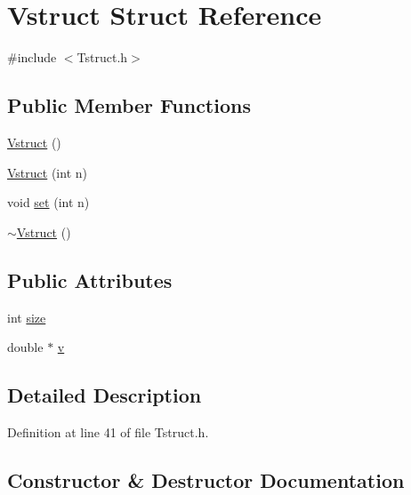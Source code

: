 \hypertarget{structVstruct}{}\section{Vstruct Struct Reference}
\label{structVstruct}


{\ttfamily \#include $<$Tstruct.\+h$>$}

\subsection*{Public Member Functions}
\begin{DoxyCompactItemize}
\item 
\hyperlink{structVstruct_a7152758ff9d7e6b9ff05a8e39a45d2e0}{Vstruct} ()
\item 
\hyperlink{structVstruct_a579bc58cb4f2ce68cf4e89aef9aa297c}{Vstruct} (int n)
\item 
void \hyperlink{structVstruct_a3c675742e102dc021c4d9a32285acb6f}{set} (int n)
\item 
\hyperlink{structVstruct_a48d29547aaec084b8deee40a1ab62710}{$\sim$\+Vstruct} ()
\end{DoxyCompactItemize}
\subsection*{Public Attributes}
\begin{DoxyCompactItemize}
\item 
int \hyperlink{structVstruct_a652f51550c7f173e94ab318318f8b2ad}{size}
\item 
double $\ast$ \hyperlink{structVstruct_ab7d3a313e027a65c847a6edf11ddffe5}{v}
\end{DoxyCompactItemize}


\subsection{Detailed Description}


Definition at line 41 of file Tstruct.\+h.



\subsection{Constructor \& Destructor Documentation}
\mbox{\label{structVstruct_a7152758ff9d7e6b9ff05a8e39a45d2e0}} 
